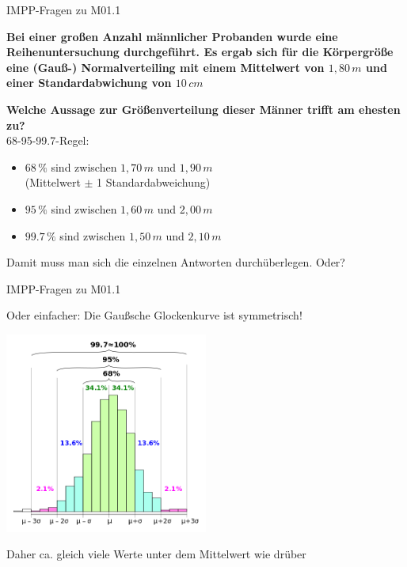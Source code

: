 \documentclass{beamer}
\begin{document}
\begin{frame}{IMPP-Fragen zu M01.1}

\textbf{Bei einer großen Anzahl männlicher Probanden wurde eine Reihenuntersuchung durchgeführt. Es ergab sich für die Körpergröße eine (Gauß-) Normalverteiling mit einem Mittelwert von \(1,80\,m\) und einer Standardabwichung von \(10\,cm\) }

\textbf{Welche Aussage zur Größenverteilung dieser Männer trifft am ehesten zu? }\\[0.2 cm]

68-95-99.7-Regel: 

\begin{itemize}
    \item 
    \(68\,\%\) sind zwischen  \(1,70\,m\) und \(1,90\,m\) \\(Mittelwert \(\pm\) 1 Standardabweichung)
    \item 
    \(95\,\%\) sind zwischen  \(1,60\,m\) und \(2,00\,m\)
    \item 
    \(99.7\,\%\) sind zwischen  \(1,50\,m\) und \(2,10\,m\)

\end{itemize}

Damit muss man sich die einzelnen Antworten durchüberlegen. \pause Oder?

\end{frame}


\begin{frame}{IMPP-Fragen zu M01.1}

Oder einfacher: Die Gaußsche Glockenkurve ist symmetrisch!

\begin{center}
    \includegraphics[width=0.5\textwidth]{Empirical_rule_histogram.png}
\end{center}

Daher ca. gleich viele Werte unter dem Mittelwert wie drüber


\end{frame}
\end{document}
